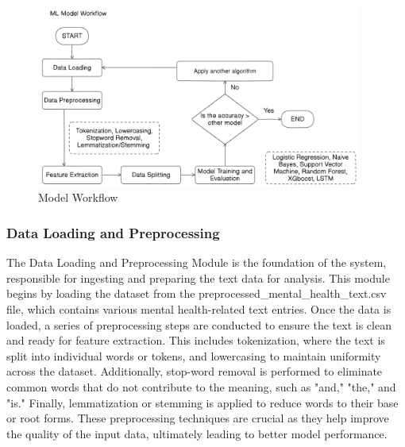 \begin{figure}[h!]  
    \centering
    \includegraphics[width=0.95\textwidth]{Images/ML Model Workflow.png}  
    \caption{Model Workflow}
    \label{Model Workflow}  %
\end{figure}

\vspace{.1in}

\subsubsection{Data Loading and Preprocessing}
\noindent
The Data Loading and Preprocessing Module is the foundation of the system, responsible for ingesting and preparing the text data for analysis. This module begins by loading the dataset from the preprocessed\_mental\_health\_text.csv file, which contains various mental health-related text entries. Once the data is loaded, a series of preprocessing steps are conducted to ensure the text is clean and ready for feature extraction. This includes tokenization, where the text is split into individual words or tokens, and lowercasing to maintain uniformity across the dataset. Additionally, stop-word removal is performed to eliminate common words that do not contribute to the meaning, such as "and," "the," and "is." Finally, lemmatization or stemming is applied to reduce words to their base or root forms. These preprocessing techniques are crucial as they help improve the quality of the input data, ultimately leading to better model performance.

